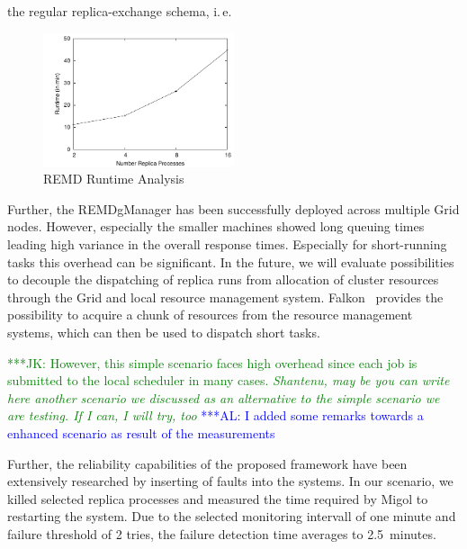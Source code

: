 \documentclass[times, 10pt, twocolumn]{article}
\newcommand{\kimnote}[1]{ {\textcolor{green} { ***JK: #1 }}}
\newcommand{\alnote}[1]{ {\textcolor{blue} { ***AL: #1 }}}
\newcommand{\kimnote}[1]{}
\newcommand{\alnote}[1]{}
\begin{document}
the regular replica-exchange schema, i.\,e.\ 
\begin{figure}[htbp]
    \centering
        \includegraphics[width=0.5\textwidth]{performance/perf_remd.pdf}
    \caption{REMD Runtime Analysis}
    \label{fig:performance_perf_runtime}
\end{figure}     
Further, the REMDgManager has been successfully deployed across multiple Grid nodes. 
However, especially the smaller machines showed long queuing times leading high variance
in the overall response times. Especially for short-running tasks this overhead can be 
significant. In the future, we will evaluate possibilities to decouple the dispatching
of replica runs from allocation of cluster resources through the Grid and local resource 
management system. Falkon~\cite{1362680} provides the possibility to acquire a chunk of
resources from the resource management systems, which can then be used to dispatch short tasks.

\kimnote{However, this simple scenario faces high overhead since each
  job is submitted to the local scheduler in many cases. \it
  Shantenu, may be you can write here another scenario we discussed
  as an alternative to the simple scenario we are testing.  If I can,
  I will try, too }            
\alnote{I added some remarks towards a enhanced scenario as result of the measurements}  

Further, the reliability capabilities of the proposed framework have
been extensively researched by inserting of faults into the
systems. In our scenario, we killed selected replica processes and
measured the time required by Migol to restarting the system.  Due to
the selected monitoring intervall of one minute and failure threshold
of 2 tries, the failure detection time averages to 2.5\, minutes.
\end{document}
